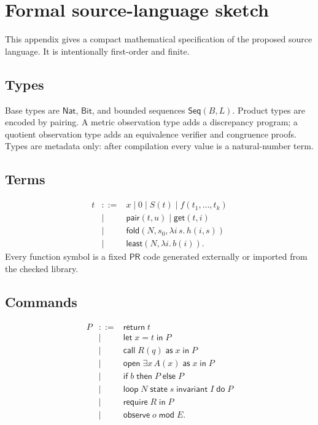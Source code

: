 \section{Formal source-language sketch}
\label{app:language}

This appendix gives a compact mathematical specification of the proposed
source language.  It is intentionally first-order and finite.

\subsection{Types}

Base types are \(\mathsf{Nat}\), \(\mathsf{Bit}\), and bounded sequences
\(\mathsf{Seq}(B,L)\).  Product types are encoded by pairing.  A metric
observation type adds a discrepancy program; a quotient observation type adds
an equivalence verifier and congruence proofs.  Types are metadata only: after
compilation every value is a natural-number term.

\subsection{Terms}

\[
\begin{array}{rcl}
t &::=& x \mid 0 \mid S(t) \mid f(t_1,\ldots,t_k)\\
  &\mid& \mathsf{pair}(t,u) \mid \mathsf{get}(t,i)\\
  &\mid& \mathsf{fold}(N,s_0,\lambda i\,s.\,h(i,s))\\
  &\mid& \mathsf{least}(N,\lambda i.\,b(i)).
\end{array}
\]
Every function symbol is a fixed \(\mathsf{PR}\) code generated externally or
imported from the checked library.

\subsection{Commands}

\[
\begin{array}{rcl}
P &::=& \mathsf{return}\;t\\
  &\mid& \mathsf{let}\;x=t\;\mathsf{in}\;P\\
  &\mid& \mathsf{call}\;R(q)\;\mathsf{as}\;x\;\mathsf{in}\;P\\
  &\mid& \mathsf{open}\;\exists x\,A(x)\;\mathsf{as}\;x\;\mathsf{in}\;P\\
  &\mid& \mathsf{if}\;b\;\mathsf{then}\;P\;\mathsf{else}\;P\\
  &\mid& \mathsf{loop}\;N\;\mathsf{state}\;s\;\mathsf{invariant}\;I\;\mathsf{do}\;P\\
  &\mid& \mathsf{require}\;R\;\mathsf{in}\;P\\
  &\mid& \mathsf{observe}\;o\;\mathsf{mod}\;E.
\end{array}
\]

